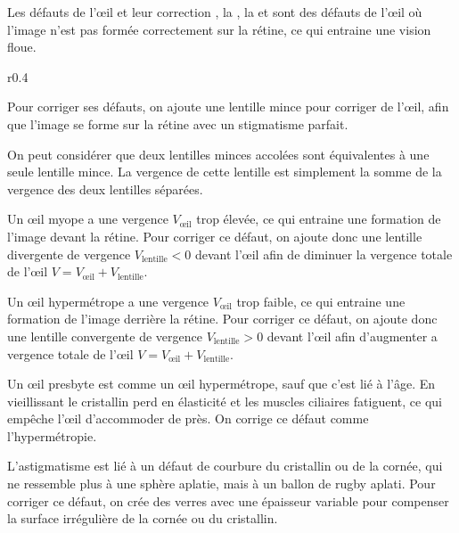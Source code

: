\begin{doc}{Les défauts de l'œil et leur correction}
  , la , la  et  sont des défauts de l'œil où l'image n'est pas formée correctement sur la rétine, ce qui entraine une vision floue.

  \begin{wrapfigure}[10]{r}{0.4\linewidth}
    \centering
    \vspace*{-2pt}
    
  \end{wrapfigure}
  
  Pour corriger ses défauts, on ajoute une lentille mince pour corriger  de l'œil, afin que l'image se forme sur la rétine avec un stigmatisme parfait.

  \begin{importants}
    On peut considérer que deux lentilles minces accolées sont équivalentes à une seule lentille mince.
    La vergence de cette lentille est simplement la somme de la vergence des deux lentilles séparées.
  \end{importants}

  \pointCyan {}

  Un œil myope a une vergence $V_\text{œil}$ trop élevée, ce qui entraine une formation de l'image devant la rétine.
  Pour corriger ce défaut, on ajoute donc une lentille divergente de vergence $V_\text{lentille} < 0$ devant l'œil afin de diminuer la vergence totale de l'œil $V = V_\text{œil} + V_\text{lentille}$.

  \pointCyan {}

  Un œil hypermétrope a une vergence $V_\text{œil}$ trop faible, ce qui entraine une formation de l'image derrière la rétine.
  Pour corriger ce défaut, on ajoute donc une lentille convergente de vergence $V_\text{lentille} > 0$ devant l'œil afin d'augmenter a vergence totale de l'œil $V = V_\text{œil} + V_\text{lentille}$.

  \pointCyan {}

  Un œil presbyte est comme un œil hypermétrope, sauf que c'est lié à l'âge.
  En vieillissant le cristallin perd en élasticité et les muscles ciliaires fatiguent, ce qui empêche l'œil d'accommoder de près.
  On corrige ce défaut comme l'hypermétropie.

  \pointCyan {}

  L'astigmatisme est lié à un défaut de courbure du cristallin ou de la cornée, qui ne ressemble plus à une sphère aplatie, mais à un ballon de rugby aplati.
  Pour corriger ce défaut, on crée des verres avec une épaisseur variable pour compenser la surface irrégulière de la cornée ou du cristallin.
\end{doc}

